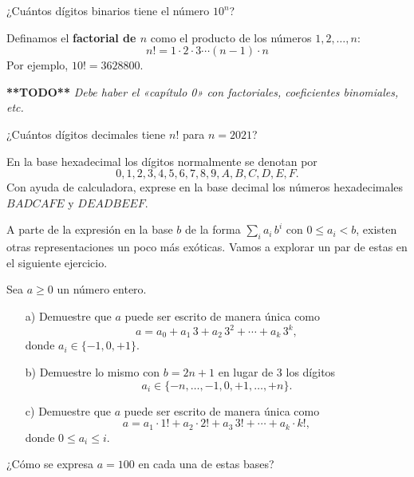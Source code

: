 \begin{ejercicio}
  ¿Cuántos dígitos binarios tiene el número $10^n$?
\end{ejercicio}

Definamos el \textbf{factorial de $n$} como el producto de los números
$1, 2, \ldots, n$:
$$n! = 1\cdot 2\cdot 3\cdots (n-1)\cdot n$$
Por ejemplo, $10! = 3628800$.

\textbf{**TODO**} \emph{Debe haber el «capítulo 0» con factoriales, coeficientes
  binomiales, etc.}

\begin{ejercicio}
  ¿Cuántos dígitos decimales tiene $n!$ para $n = 2021$?
\end{ejercicio}

\begin{ejercicio}
  En la base hexadecimal los dígitos normalmente se denotan por
  $$0,1,2,3,4,5,6,7,8,9,A,B,C,D,E,F.$$
  Con ayuda de calculadora, exprese en la base decimal los números hexadecimales
  $BADCAFE$ y $DEADBEEF$.
\end{ejercicio}

A parte de la expresión en la base $b$ de la forma $\sum_i a_i\,b^i$ con
$0 \le a_i < b$, existen otras representaciones un poco más exóticas. Vamos a
explorar un par de estas en el siguiente ejercicio.

\begin{ejercicio}
  Sea $a \ge 0$ un número entero.

  \begin{enumerate}
  \item[a)] Demuestre que $a$ puede ser escrito de manera única como
    $$a = a_0 + a_1\,3 + a_2\,3^2 + \cdots + a_k\,3^k,$$
    donde $a_i \in \{ -1, 0, +1 \}$.

  \item[b)] Demuestre lo mismo con $b = 2n+1$ en lugar de $3$ los dígitos
    $$a_i \in \{ -n, \ldots, -1, 0, +1, \ldots, +n \}.$$

  \item[c)] Demuestre que $a$ puede ser escrito de manera única como
    $$a = a_1\cdot 1! + a_2\cdot 2! + a_3\,3! + \cdots + a_k\cdot k!,$$
    donde $0 \le a_i \le i$.
  \end{enumerate}

  ¿Cómo se expresa $a = 100$ en cada una de estas bases?
\end{ejercicio}

